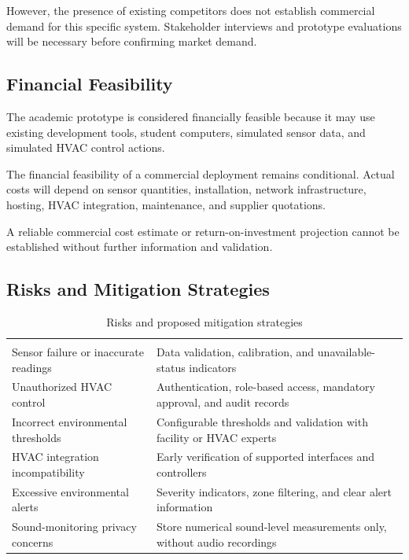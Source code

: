 \documentclass[11pt,a4paper]{article}
\begin{document}
However, the presence of existing competitors does not establish commercial demand for this specific system. Stakeholder interviews and prototype evaluations will be necessary before confirming market demand.

\subsection{Financial Feasibility}
The academic prototype is considered financially feasible because it may use existing development tools, student computers, simulated sensor data, and simulated HVAC control actions.

The financial feasibility of a commercial deployment remains conditional. Actual costs will depend on sensor quantities, installation, network infrastructure, hosting, HVAC integration, maintenance, and supplier quotations.

A reliable commercial cost estimate or return-on-investment projection cannot be established without further information and validation.

\subsection{Risks and Mitigation Strategies}
{\small\stripe
\begin{xltabular}{\linewidth}{|L{6.2cm}|Y|}
\caption{Risks and proposed mitigation strategies}\label{tab:risks}\\
\hline\headrow
{} & \\\hline
\endfirsthead
\hline\headrow
{} & \\\hline
\endhead
Sensor failure or inaccurate readings & Data validation, calibration, and unavailable-status indicators\\\hline
Unauthorized HVAC control & Authentication, role-based access, mandatory approval, and audit records\\\hline
Incorrect environmental thresholds & Configurable thresholds and validation with facility or HVAC experts\\\hline
HVAC integration incompatibility & Early verification of supported interfaces and controllers\\\hline
Excessive environmental alerts & Severity indicators, zone filtering, and clear alert information\\\hline
Sound-monitoring privacy concerns & Store numerical sound-level measurements only, without audio recordings\\\hline
\end{xltabular}}
\end{document}
